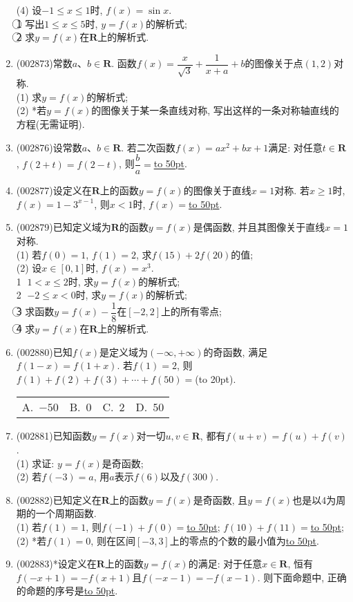 \documentclass[10pt,a4paper]{article}
\newcommand{\blank}[1]{\underline{\hbox to #1pt{}}}
\newcommand{\bracket}[1]{(\hbox to #1pt{})}
\newcommand{\fourch}[4]{\par\begin{tabular}{p{.23\textwidth}p{.23\textwidth}p{.23\textwidth}p{.23\textwidth}}
A.~#1 &B.~#2& C.~#3& D.~#4
\end{tabular}}
\begin{document}
\begin{enumerate}[1.]
(4) 设$-1\le x\le 1$时, $f(x)=\sin x$.\\
\textcircled{1} 写出$1\le x\le 5$时, $y=f(x)$的解析式;\\
\textcircled{2} 求$y=f(x)$在$\mathbf{R}$上的解析式.
\item {\tiny (002873)}常数$a$、$b\in \mathbf{R}$. 函数$f(x)=\dfrac x{\sqrt 3}+\dfrac 1{x+a}+b$的图像关于点$(1,2)$对称.\\
(1) 求$y=f(x)$的解析式;\\
(2) *若$y=f(x)$的图像关于某一条直线对称, 写出这样的一条对称轴直线的方程(无需证明).
\item {\tiny (002876)}设常数$a$、$b\in \mathbf{R}$. 若二次函数$f(x)=ax^2+bx+1$满足: 对任意$t\in \mathbf{R}$, $f(2+t)=f(2-t)$, 则$\dfrac ba=$\blank{50}.
\item {\tiny (002877)}设定义在$\mathbf{R}$上的函数$y=f(x)$的图像关于直线$x=1$对称. 若$x\ge 1$时, $f(x)=1-3^{x-1}$, 则$x<1$时, $f(x)=$\blank{50}.
\item {\tiny (002879)}已知定义域为$\mathbf{R}$的函数$y=f(x)$是偶函数, 并且其图像关于直线$x=1$对称.\\
(1) 若$f(0)=1$, $f(1)=2$, 求$f(15)+2f(20)$的值;\\
(2) 设$x\in [0,1]$时, $f(x)=x^3$.\\
\textcircled{1} $1<x\le 2$时, 求$y=f(x)$的解析式;\\
\textcircled{2} $-2\le x<0$时, 求$y=f(x)$的解析式;\\
\textcircled{3} 求函数$y=f(x)-\dfrac 18$在$[-2,2]$上的所有零点;\\
\textcircled{4} 求$y=f(x)$在$\mathbf{R}$上的解析式.
\item {\tiny (002880)}已知$f(x)$是定义域为$(-\infty,+\infty)$的奇函数, 满足$f(1-x)=f(1+x)$. 若$f(1)=2$, 则$f(1)+f(2)+f(3)+\cdots +f(50)=$\bracket{20}.
\fourch{$-50$}{$0$}{$2$}{$50$}
\item {\tiny (002881)}已知函数$y=f(x)$对一切$u,v\in \mathbf{R}$, 都有$f(u+v)=f(u)+f(v)$.\\
(1)	求证: $y=f(x)$是奇函数;\\ 
(2) 若$f(-3)=a$, 用$a$表示$f(6)$以及$f(300)$.
\item {\tiny (002882)}已知定义在$\mathbf{R}$上的函数$y=f(x)$是奇函数, 且$y=f(x)$也是以4为周期的一个周期函数.\\
(1) 若$f(1)=1$, 则$f(-1)+f(0)=$\blank{50}; $f(10)+f(11)=$\blank{50};\\
(2) *若$f(1)=0$, 则在区间$[-3,3]$上的零点的个数的最小值为\blank{50}.
\item {\tiny (002883)}*设定义在$\mathbf{R}$上的函数$y=f(x)$的满足: 对于任意$x\in \mathbf{R}$, 恒有$f(-x+1)=-f(x+1)$且$f(-x-1)=-f(x-1)$. 则下面命题中, 正确的命题的序号是\blank{50}.\\

\end{enumerate}
\end{document}
